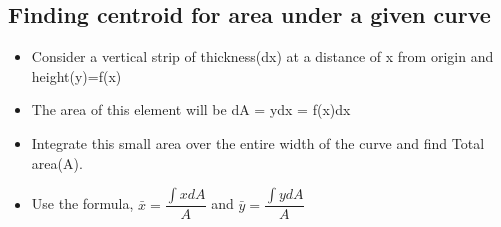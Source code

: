 \documentclass[8pt]{report}
\begin{document}
	\subsection{Finding centroid for area under a given curve}
		\begin{itemize}
			\item Consider a vertical strip of thickness(dx) at a distance of x from origin and height(y)=f(x)
			\item The area of this element will be dA = ydx = f(x)dx
			\item Integrate this small area over the entire width of the curve and find Total area(A).
			\item Use the formula, $\bar{x} = \dfrac{\int xdA}{A}$ and $\bar{y}=\dfrac{\int ydA}{A}$
		\end{itemize}\hrulefill
\end{document}
